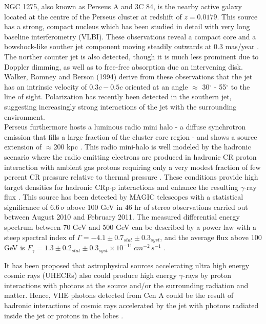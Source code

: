 \documentclass[useAMS,usenatbib,a4]{mn2e}
\begin{document}
NGC 1275, also known as Perseus A and 3C 84, is the nearby active galaxy located at the centre of the Perseus cluster at  redshift of $z=0.0179$.   This source has a strong, compact nucleus which has been studied in detail with very long baseline interferometry (VLBI)\cite{ver94, tay06, wal00, asa06}.  These observations reveal a compact core and a bowshock-like souther jet component moving steadily outwards  
at 0.3 mas/year \cite{kel04,lis09}.  The norther counter jet is also detected, though it is much less prominent due to Doppler dimming, as well as to free-free absorption due an intervening disk.    Walker, Romney and Berson (1994) derive from these observations that the jet has an intrinsic velocity of $0.3c - 0.5c$ oriented at an angle $\approx$ 30$^\circ$ - 55$^\circ$ to the line of sight.  Polarization has recently been detected in the southern jet\cite{tay06}, suggesting increasingly strong interactions of the jet with the surrounding environment\cite{abd09a}.\\   
Perseus furthermore hosts a luminous radio mini halo - a diffuse synchrotron emission that fills a large fraction of the cluster core region - and shows a source extension of $\approx$200 kpc \cite{ped90}.  This radio mini-halo is well modeled by the hadronic scenario where the radio emitting electrons are produced in hadronic CR proton interaction with ambient gas protons requiring only a very modest fraction of  few percent CR pressure relative to thermal pressure \cite{pfr04}.   These conditions provide high target densities for hadronic CRp-p interactions and enhance the resulting $\gamma$-ray flux \cite{ale10}. This source has been detected by MAGIC telescopes with a statistical significance of $6.6\,\sigma$ above 100 GeV in 46 hr of stereo observations carried out between August 2010 and February 2011.  The measured differential energy spectrum between 70 GeV and 500 GeV can be described by a power law with a steep spectral index of $\Gamma=-4.1\pm0.7_{stat}\pm0.3_{syst}$, and the average flux above 100 GeV is $F_{\gamma}=1.3\pm 0.2_{stat}\pm0.3_{syst}\times 10^{-11}\,cm^{-2}\,s^{-1}$ \cite{ale12}.  





It has been proposed that astrophysical sources accelerating ultra high energy cosmic rays (UHECRs) also could produce
high energy $\gamma$-rays by proton interactions with photons at the source and/or the surrounding radiation and matter.  Hence, VHE photons detected from Cen A could be the result of hadronic interactions of cosmic rays accelerated by the jet with photons radiated inside the jet 
or protons in the lobes \citep{gop10, rie09, kac09a, kac09b, rom96, iso02, hon09, abd10, der09}.
\end{document}
